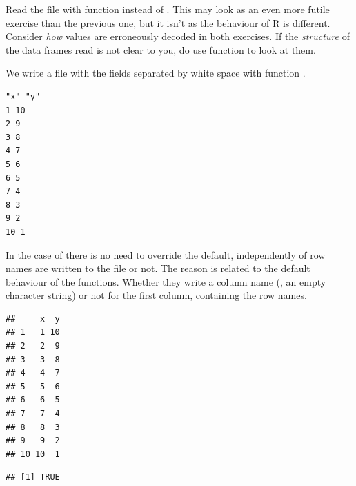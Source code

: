 \documentclass[krantz2,ChapterTOCs]{krantz}\usepackage{knitr}
\begin{document}
\begin{playground}
Read the file with function  instead of . This may look as an even more futile exercise than the previous one, but it isn't as the behaviour of R is different. Consider \emph{how} values are erroneously decoded in both exercises. If the \emph{structure} of the data frames read is not clear to you, do use function  to look at them.
\end{playground}

We write a file with the fields separated by white space with function .
\begin{knitrout}\footnotesize
{}\color{fgcolor}\begin{kframe}
\begin{alltt}
  \hlstd{=} \hlstd{,}  \hlstd{=} \hlstd{)}
\hlstd{(}\hlstd{,}  \hlstd{=} \hlstd{)}
\end{alltt}
\end{kframe}
\end{knitrout}

\begin{knitrout}\footnotesize
{}\color{fgcolor}\begin{kframe}
\begin{verbatim}
"x" "y"
1 10
2 9
3 8
4 7
5 6
6 5
7 4
8 3
9 2
10 1
\end{verbatim}
\end{kframe}
\end{knitrout}

In the case of  there is no need to override the default, independently of row names are written to the file or not. The reason is related to the default behaviour of the  functions. Whether they write a column name (, an empty character string) or not for the first column, containing the row names.
\begin{knitrout}\footnotesize
{}\color{fgcolor}\begin{kframe}
\begin{alltt}
 \hlkwb{<-} \hlstd{(} \hlstd{=} \hlstd{,}  \hlstd{=} \hlstd{)}
\end{alltt}
\begin{verbatim}
##     x  y
## 1   1 10
## 2   2  9
## 3   3  8
## 4   4  7
## 5   5  6
## 6   6  5
## 7   7  4
## 8   8  3
## 9   9  2
## 10 10  1
\end{verbatim}
\begin{alltt}
  \hlstd{=} \hlstd{)}
\end{alltt}
\begin{verbatim}
## [1] TRUE
\end{verbatim}
\end{kframe}
\end{knitrout}
\end{document}
